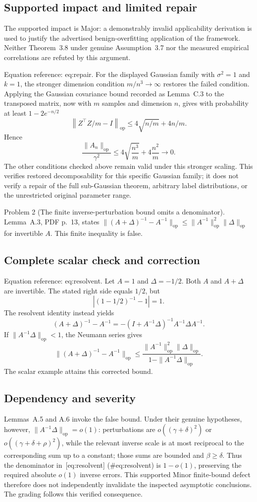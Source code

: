 \documentclass[10pt]{article}
\begin{document}
\subsection*{Supported impact and limited repair}
The supported impact is Major: a demonstrably invalid applicability derivation is used to justify the advertised benign-overfitting application of the framework. Neither Theorem 3.8 under genuine Assumption 3.7 nor the measured empirical correlations are refuted by this argument.\par
Equation reference: eq:repair. For the displayed Gaussian family with \(\sigma^2=1\) and \(k=1\), the stronger dimension condition \(m/n^3\to\infty\) restores the failed condition. Applying the Gaussian covariance bound recorded as Lemma C.3 to the transposed matrix, now with \(m\) samples and dimension \(n\), gives with probability at least \(1-2e^{-n/2}\) \[\left\|Z^\top Z/m-I\right\|_{\mathrm{op}}
 \le4\sqrt{n/m}+4n/m.\] Hence \[
 \frac{\|A_n\|_{\mathrm{op}}}{\gamma^2}
 \le4\sqrt{\frac{n^3}{m}}+4\frac{n^2}{m}\longrightarrow0.\] The other conditions checked above remain valid under this stronger scaling. This verifies restored decomposability for this specific Gaussian family; it does not verify a repair of the full sub-Gaussian theorem, arbitrary label distributions, or the unrestricted original parameter range.\par
Problem 2 (The finite inverse-perturbation bound omits a denominator).  Lemma A.3, PDF p. 13, states \(\|(A+\Delta)^{-1}-A^{-1}\|_{\mathrm{op}}\le
\|A^{-1}\|_{\mathrm{op}}^2\|\Delta\|_{\mathrm{op}}\) for invertible \(A\). This finite inequality is false.\par
\subsection*{Complete scalar check and correction}
Equation reference: eq:resolvent. Let \(A=1\) and \(\Delta=-1/2\). Both \(A\) and \(A+\Delta\) are invertible. The stated right side equals \(1/2\), but \[|(1-1/2)^{-1}-1|=1.\] The resolvent identity instead yields \[(A+\Delta)^{-1}-A^{-1}
 =-(I+A^{-1}\Delta)^{-1}A^{-1}\Delta A^{-1}.\] If \(\|A^{-1}\Delta\|_{\mathrm{op}}<1\), the Neumann series gives \[
 \|(A+\Delta)^{-1}-A^{-1}\|_{\mathrm{op}}
 \le\frac{\|A^{-1}\|_{\mathrm{op}}^2\|\Delta\|_{\mathrm{op}}}
 {1-\|A^{-1}\Delta\|_{\mathrm{op}}}.\] The scalar example attains this corrected bound.\par
\subsection*{Dependency and severity}
Lemmas A.5 and A.6 invoke the false bound. Under their genuine hypotheses, however, \(\|A^{-1}\Delta\|_{\mathrm{op}}=o(1)\): perturbations are \(o((\gamma+\delta)^2)\) or \(o((\gamma+\delta+\rho)^2)\), while the relevant inverse scale is at most reciprocal to the corresponding sum up to a constant; those sums are bounded and \(\beta\ge\delta\). Thus the denominator in [eq:resolvent] (\#eq:resolvent) is \(1-o(1)\), preserving the required absolute \(o(1)\) inverse errors. This supported Minor finite-bound defect therefore does not independently invalidate the inspected asymptotic conclusions. The grading follows this verified consequence.\par
\end{document}

